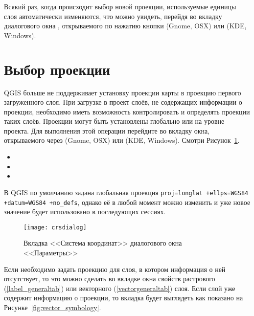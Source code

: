 Всякий раз, когда происходит выбор новой проекции, используемые единицы
слоя автоматически изменяются, что можно увидеть, перейдя во вкладку
 диалогового окна , открываемого по нажатию кнопки  (Gnome,
OSX) или  (KDE, Windows).

\section{Выбор проекции}
\label{sec:projection-specifying}

QGIS больше не поддерживает установку проекции карты в проекцию
первого загруженного слоя. При загрузке в проект слоёв, не содержащих
информации о проекции, необходимо иметь возможность контролировать и
определять проекции таких слоёв. Проекции могут быть установлены глобально
или на уровне проекта. Для выполнения этой операции перейдите во вкладку
 окна, открываемого через 
\arrow {} (Gnome, OSX) или
 \arrow {} (KDE,
Windows). Смотри Рисунок~\ref{fig:crsdialog}.

\begin{itemize}[label=--]
\item {}
\item {}
\item {}
\end{itemize}

В QGIS по умолчанию задана глобальная проекция \texttt{proj=longlat +ellps=WGS84
+datum=WGS84 +no\_defs}, однако её в любой момент можно изменить и уже новое
значение будет использовано в последующих сессиях.

\begin{figure}[ht]
   \centering
   \texttt{[image: crsdialog]}
   \caption{Вкладка <<Система координат>> диалогового окна <<Параметры>> \wincaption}\label{fig:crsdialog}
\end{figure}

Если необходимо задать проекцию для слоя, в котором информация о ней
отсутствует, то это можно сделать во вкладке  окна свойств растрового
(\ref{label_generaltab}) или векторного (\ref{vectorgeneraltab}) слоя. Если
слой уже содержит информацию о проекции, то вкладка будет выглядеть как показано
на Рисунке~\ref{fig:vector_symbology}.

